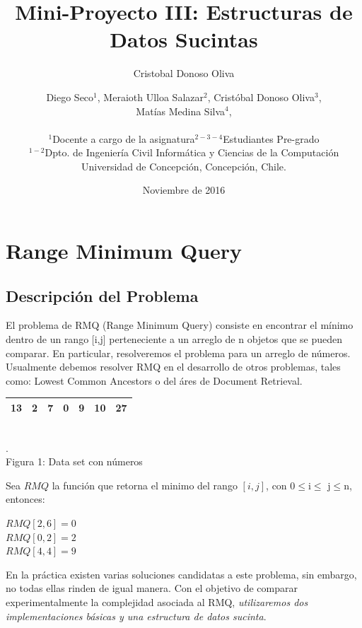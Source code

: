 \documentclass[11pt]{article}
\title{Mini-Proyecto III: Estructuras de Datos Sucintas}
\author{Cristobal Donoso Oliva}
\author{
Diego Seco$^{1}$, Meraioth Ulloa Salazar$^{2}$, Cristóbal Donoso Oliva$^{3}$,\\ Matías Medina Silva$^{4}$,\\ \\
\small{$^{1}$Docente a cargo de la asignatura$^{2-3-4}$Estudiantes Pre-grado}\\
\small{$^{1-2}$Dpto. de Ingeniería Civil Informática y Ciencias de la Computación}\\
\small{Universidad de Concepción, Concepción, Chile.}\\
}
\date{Noviembre de 2016}
\begin{document}
\maketitle

\section{Range Minimum Query}
\subsection{Descripción del Problema}
El problema de RMQ (Range Minimum Query) consiste en encontrar el mínimo dentro de un rango [i,j] perteneciente a un arreglo de n objetos que se pueden comparar. En particular, resolveremos el problema para un arreglo de números. Usualmente debemos resolver RMQ en el desarrollo de otros problemas, tales como: Lowest Common Ancestors o del áres de Document Retrieval.
\begin{center}\begin{tabular}{|c|c|c|c|c|c|c|}
\hline
	13 & 2 & 7 & 0 & 9 & 10 & 27 \\
\hline
\end{tabular}
\\\scriptsize{\color{white}.\color{black}\\Figura 1: Data set con números}
\end{center}
Sea $RMQ$ la función que retorna el minimo del rango $[i,j]$, con 0$\le$i$\le$ j$\le$n, entonces: \begin{center}$RMQ[2,6] = 0$\\$RMQ[0,2] = 2$\\$RMQ[4,4] = 9$\end{center}  
En la práctica existen varias soluciones candidatas a este problema, sin embargo, no todas ellas rinden de igual manera. Con el objetivo de comparar experimentalmente la complejidad asociada al RMQ, \emph{utilizaremos dos implementaciones básicas y una estructura de datos sucinta}.
\end{document}
